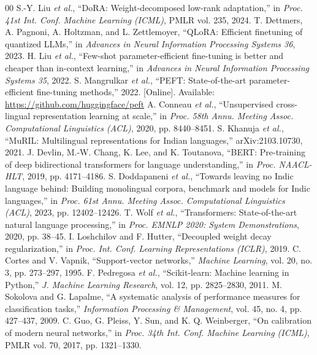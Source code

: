 \documentclass[conference]{IEEEtran}
\begin{document}
\begin{thebibliography}{00}
 S.-Y. Liu \textit{et al.}, ``DoRA: Weight-decomposed low-rank adaptation,'' in \textit{Proc. 41st Int. Conf. Machine Learning (ICML)}, PMLR vol. 235, 2024.
 T. Dettmers, A. Pagnoni, A. Holtzman, and L. Zettlemoyer, ``QLoRA: Efficient finetuning of quantized LLMs,'' in \textit{Advances in Neural Information Processing Systems 36}, 2023.
 H. Liu \textit{et al.}, ``Few-shot parameter-efficient fine-tuning is better and cheaper than in-context learning,'' in \textit{Advances in Neural Information Processing Systems 35}, 2022.
 S. Mangrulkar \textit{et al.}, ``PEFT: State-of-the-art parameter-efficient fine-tuning methods,'' 2022. [Online]. Available: \url{https://github.com/huggingface/peft}
 A. Conneau \textit{et al.}, ``Unsupervised cross-lingual representation learning at scale,'' in \textit{Proc. 58th Annu. Meeting Assoc. Computational Linguistics (ACL)}, 2020, pp. 8440--8451.
 S. Khanuja \textit{et al.}, ``MuRIL: Multilingual representations for Indian languages,'' arXiv:2103.10730, 2021.
 J. Devlin, M.-W. Chang, K. Lee, and K. Toutanova, ``BERT: Pre-training of deep bidirectional transformers for language understanding,'' in \textit{Proc. NAACL-HLT}, 2019, pp. 4171--4186.
 S. Doddapaneni \textit{et al.}, ``Towards leaving no Indic language behind: Building monolingual corpora, benchmark and models for Indic languages,'' in \textit{Proc. 61st Annu. Meeting Assoc. Computational Linguistics (ACL)}, 2023, pp. 12402--12426.
 T. Wolf \textit{et al.}, ``Transformers: State-of-the-art natural language processing,'' in \textit{Proc. EMNLP 2020: System Demonstrations}, 2020, pp. 38--45.
 I. Loshchilov and F. Hutter, ``Decoupled weight decay regularization,'' in \textit{Proc. Int. Conf. Learning Representations (ICLR)}, 2019.
 C. Cortes and V. Vapnik, ``Support-vector networks,'' \textit{Machine Learning}, vol. 20, no. 3, pp. 273--297, 1995.
 F. Pedregosa \textit{et al.}, ``Scikit-learn: Machine learning in Python,'' \textit{J. Machine Learning Research}, vol. 12, pp. 2825--2830, 2011.
 M. Sokolova and G. Lapalme, ``A systematic analysis of performance measures for classification tasks,'' \textit{Information Processing \& Management}, vol. 45, no. 4, pp. 427--437, 2009.
 C. Guo, G. Pleiss, Y. Sun, and K. Q. Weinberger, ``On calibration of modern neural networks,'' in \textit{Proc. 34th Int. Conf. Machine Learning (ICML)}, PMLR vol. 70, 2017, pp. 1321--1330.

\end{thebibliography}
\end{document}
